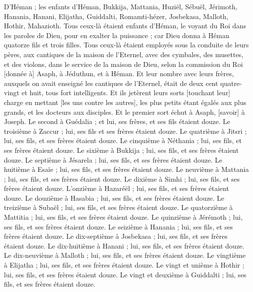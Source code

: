 \begin{multicols}{2}
D'Héman ; les enfants d'Héman, Bukkija, Mattania, Huziël, Sébuël, Jérimoth, Hanania, Hanani, Elijatha, Guiddalti, Romamti-hézer, Josbekasa, Malloth, Hothir, Mahazioth.
Tous ceux-là étaient enfants d'Héman, le voyant du Roi dans les paroles de Dieu, pour en exalter la puissance ; car Dieu donna à Héman quatorze fils et trois filles.
Tous ceux-là étaient employés sous la conduite de leurs pères, aux cantiques de la maison de l'Eternel, avec des cymbales, des musettes, et des violons, dans le service de la maison de Dieu, selon la commission du Roi [donnée à] Asaph, à Jéduthun, et à Héman.
Et leur nombre avec leurs frères, auxquels on avait enseigné les cantiques de l'Eternel, était de deux cent quatre-vingt et huit, tous fort intelligents.
Et ils jetèrent leurs sorts [touchant leur] charge en mettant [les uns contre les autres], les plus petits étant égalés aux plus grands, et les docteurs aux disciples.
Et le premier sort échut à Asaph, [savoir] à Joseph. Le second à Guédalia ; et lui, ses frères, et ses fils étaient douze.
Le troisième à Zaccur ; lui, ses fils et ses frères étaient douze.
Le quatrième à Jitsri ; lui, ses fils, et ses frères étaient douze.
Le cinquième à Néthania ; lui, ses fils, et ses frères étaient douze.
Le sixième à Bukkija ; lui, ses fils, et ses frères étaient douze.
Le septième à Jésarela ; lui, ses fils, et ses frères étaient douze.
Le huitième à Esaïe ; lui, ses fils, et ses frères étaient douze.
Le neuvième à Mattania ; lui, ses fils, et ses frères étaient douze.
Le dixième à Simhi ; lui, ses fils, et ses frères étaient douze.
L'onzième à Hazaréël ; lui, ses fils, et ses frères étaient douze.
Le douzième à Hasabia ; lui, ses fils, et ses frères étaient douze.
Le treizième à Subaël ; lui, ses fils, et ses frères étaient douze.
Le quatorzième à Mattitia ; lui, ses fils, et ses frères étaient douze.
Le quinzième à Jérémoth ; lui, ses fils, et ses frères étaient douze.
Le seizième à Hanania ; lui, ses fils, et ses frères étaient douze.
Le dix-septième à Josbekasa ; lui, ses fils, et ses frères étaient douze.
Le dix-huitième à Hanani ; lui, ses fils, et ses frères étaient douze.
Le dix-neuvième à Malloth ; lui, ses fils, et ses frères étaient douze.
Le vingtième à Elijatha ; lui, ses fils, et ses frères étaient douze.
Le vingt et unième à Hothir ; lui, ses fils, et ses frères étaient douze.
Le vingt et deuxième à Guiddalti ; lui, ses fils, et ses frères étaient douze.

\end{multicols}
